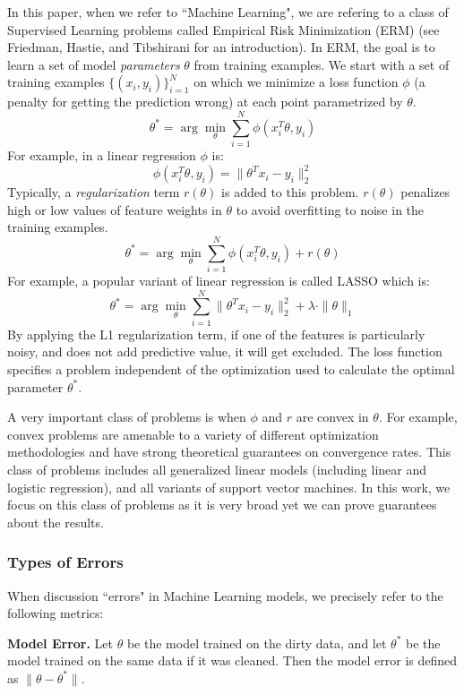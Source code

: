 In this paper, when we refer to ``Machine Learning", we are refering to a class of Supervised Learning problems called Empirical Risk Minimization (ERM) (see Friedman, Hastie, and Tibshirani \cite{friedman2001elements} for an introduction).
In ERM, the goal is to learn a set of model \emph{parameters} $\theta$ from training examples.
We start with a set of training examples $\{(x_{i},y_{i})\}_{i=1}^{N}$
on which we minimize a loss function $\phi$ (a penalty for getting the prediction wrong) at each point parametrized by $\theta$.
\[
 \theta^{*}=\arg\min_{\theta}\sum_{i=1}^{N}\phi(x_{i}^T\theta,y_{i})
\]
For example, in a linear regression $\phi$ is:
\[
\phi(x_{i}^T\theta,y_{i}) = \|\theta^Tx_{i} - y_i \|_2^2
\]
Typically, a \emph{regularization} term $r(\theta)$ is added to this problem.
$r(\theta)$ penalizes high or low values of feature weights in $\theta$ to avoid overfitting to noise in the training examples.
\[
 \theta^{*}=\arg\min_{\theta}\sum_{i=1}^{N}\phi(x_{i}^T\theta,y_{i}) + r(\theta)
\]
For example, a popular variant of linear regression is called LASSO which is:
\[
 \theta^{*}=\arg\min_{\theta}\sum_{i=1}^{N}\|\theta^Tx_{i} - y_i \|_2^2 + \lambda \cdot \|\theta\|_1
\]
By applying the L1 regularization term, if one of the features is particularly noisy, and does not add predictive value, it will get excluded.
The loss function specifies a problem independent of the optimization used to calculate the optimal parameter $\theta^{*}$.

A very important class of problems is when $\phi$ and $r$ are convex in $\theta$.
For example, convex problems are amenable to a variety of different optimization methodologies
and have strong theoretical guarantees on convergence rates.
This class of problems includes all generalized linear models (including linear and logistic regression), and all variants of support vector machines.
In this work, we focus on this class of problems as it is very broad yet we can prove guarantees about the results.

\subsubsection{Types of Errors}
When discussion ``errors" in Machine Learning models, we precisely refer to the following metrics:

\vspace{0.5em}

\noindent\textbf{Model Error. } Let $\theta$ be the model trained on the dirty data, and let $\theta^*$ be the model trained on the same data if it was cleaned. Then the model error is defined as $\|\theta - \theta^*\|$.


